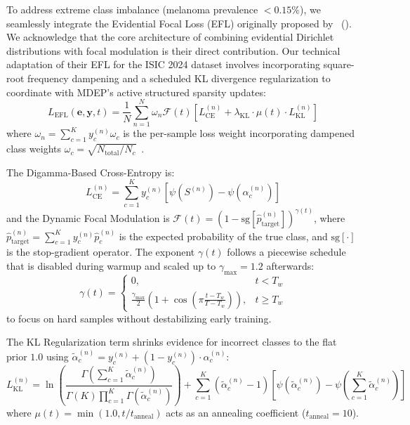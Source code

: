 \documentclass[letterpaper]{article} %
\begin{document}
To address extreme class imbalance (melanoma prevalence $<0.15\%$), we seamlessly integrate the Evidential Focal Loss (EFL) originally proposed by \citeauthor{zhou2023domain}~(\citeyear{zhou2023domain}). We acknowledge that the core architecture of combining evidential Dirichlet distributions with focal modulation is their direct contribution. Our technical adaptation of their EFL for the ISIC 2024 dataset involves incorporating square-root frequency dampening and a scheduled KL divergence regularization to coordinate with MDEP's active structured sparsity updates:
\begin{equation}\label{eq:efl}
    L_{\text{EFL}}(\bm{e}, \bm{y}, t) = \frac{1}{N} \sum_{n=1}^N \omega_n \mathcal{F}(t) \left[ L_{\text{CE}}^{(n)} + \lambda_{\text{KL}} \cdot \mu(t) \cdot L_{\text{KL}}^{(n)}\right]
\end{equation}
where $\omega_n = \sum_{c=1}^K y_c^{(n)} \omega_c$ is the per-sample loss weight incorporating dampened class weights $\omega_c = \sqrt{N_{\text{total}} / N_c}$~\cite{cui2019class}. 

The Digamma-Based Cross-Entropy is:
\begin{equation}
    L_{\text{CE}}^{(n)} = \sum_{c=1}^K y_c^{(n)} \left[\psi(S^{(n)}) - \psi(\alpha_c^{(n)})\right]
\end{equation}
and the Dynamic Focal Modulation is $\mathcal{F}(t) = (1 - \text{sg}[\hat{p}_{\text{target}}^{(n)}])^{\gamma(t)}$, where $\hat{p}_{\text{target}}^{(n)} = \sum_{c=1}^K y_c^{(n)} \hat{p}_c^{(n)}$ is the expected probability of the true class, and $\text{sg}[\cdot]$ is the stop-gradient operator. The exponent $\gamma(t)$ follows a piecewise schedule that is disabled during warmup and scaled up to $\gamma_{\max}=1.2$ afterwards:
\begin{equation}
    \gamma(t) = \begin{cases} 
    0, & t < T_w \\
    \frac{\gamma_{\max}}{2} \left(1 + \cos\left(\pi \frac{t - T_w}{T - T_w}\right)\right), & t \ge T_w 
    \end{cases}
\end{equation}
to focus on hard samples without destabilizing early training.

The KL Regularization term shrinks evidence for incorrect classes to the flat prior $1.0$ using $\tilde{\alpha}_c^{(n)} = y_c^{(n)} + (1 - y_c^{(n)}) \cdot \alpha_c^{(n)}$:
\begin{equation}\label{eq:kl_loss_n}
    L_{\text{KL}}^{(n)} = \ln \left( \frac{\Gamma\left(\sum_{c=1}^K \tilde{\alpha}_c^{(n)}\right)}{\Gamma(K) \prod_{c=1}^K \Gamma(\tilde{\alpha}_c^{(n)})} \right) + \sum_{c=1}^K (\tilde{\alpha}_c^{(n)} - 1)\left[\psi(\tilde{\alpha}_c^{(n)}) - \psi\!\left(\sum_{c=1}^K \tilde{\alpha}_c^{(n)}\right)\right]
\end{equation}
where $\mu(t) = \min(1.0, t / t_{\text{anneal}})$ acts as an annealing coefficient ($t_{\text{anneal}} = 10$).
\end{document}
